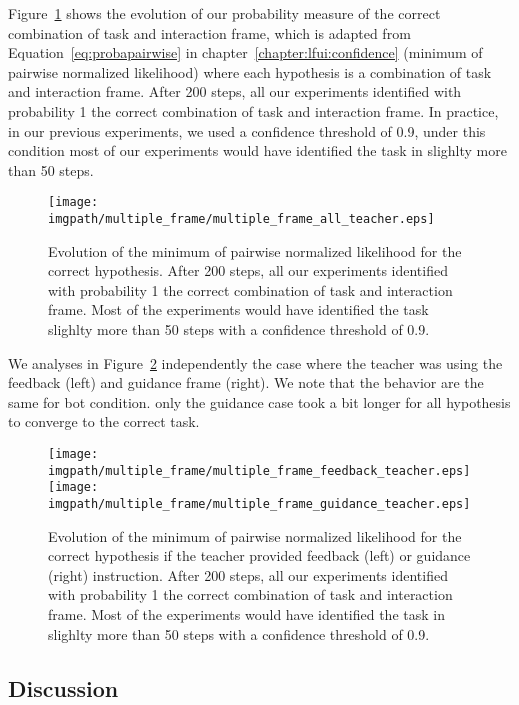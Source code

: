 Figure~\ref{fig:multipleframeall} shows the evolution of our probability measure of the correct combination of task and interaction frame, which is adapted from Equation~\ref{eq:probapairwise} in chapter~\ref{chapter:lfui:confidence} (minimum of pairwise normalized likelihood) where each hypothesis is a combination of task and interaction frame. After 200 steps, all our experiments identified with probability 1 the correct combination of task and interaction frame. In practice, in our previous experiments, we used a confidence threshold of 0.9, under this condition most of our experiments would have identified the task in slighlty more than 50 steps.

\begin{figure}[!htbp]
\centering
\texttt{[image: \\imgpath/multiple\_frame/multiple\_frame\_all\_teacher.eps]}
\caption{Evolution of the minimum of pairwise normalized likelihood for the correct hypothesis. After 200 steps, all our experiments identified with probability 1 the correct combination of task and interaction frame. Most of the experiments would have identified the task slighlty more than 50 steps with a confidence threshold of 0.9.}
\label{fig:multipleframeall}
\end{figure} 

We analyses in Figure~\ref{fig:multipleframefeedbackvsguidance} independently the case where the teacher was using the feedback (left) and guidance frame (right). We note that the behavior are the same for bot condition. only the guidance case took a bit longer for all hypothesis to converge to the correct task.

\begin{figure}[!htbp]
\centering
\texttt{[image: \\imgpath/multiple\_frame/multiple\_frame\_feedback\_teacher.eps]}
\texttt{[image: \\imgpath/multiple\_frame/multiple\_frame\_guidance\_teacher.eps]}
\caption{Evolution of the minimum of pairwise normalized likelihood for the correct hypothesis if the teacher provided feedback (left) or guidance (right) instruction. After 200 steps, all our experiments identified with probability 1 the correct combination of task and interaction frame. Most of the experiments would have identified the task in slighlty more than 50 steps with a confidence threshold of 0.9.}
\label{fig:multipleframefeedbackvsguidance}
\end{figure} 


\subsection{Discussion}

